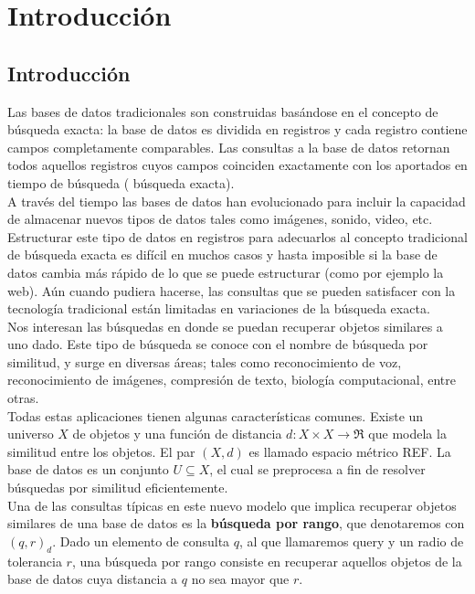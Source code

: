 \chapter{Introducci\'on}

\section{Introducci\'on}
Las bases de datos tradicionales son construidas bas\'andose en el concepto de b\'usqueda exacta: la base de datos es dividida en registros y cada registro contiene campos completamente comparables. Las consultas a la base de datos retornan todos aquellos registros cuyos campos coinciden exactamente con los aportados en tiempo de b\'usqueda ( b\'usqueda exacta).\\
				
A trav\'es del tiempo las bases de datos han evolucionado para incluir la capacidad de almacenar nuevos tipos de datos tales como im\'agenes, sonido, video, etc. Estructurar este tipo de datos en registros para adecuarlos al concepto tradicional de b\'usqueda exacta es dif\'icil en muchos casos y hasta imposible si la base de datos cambia m\'as r\'apido de lo que se puede estructurar (como por ejemplo la web). A\'un cuando pudiera hacerse, las consultas que se pueden satisfacer con la tecnolog\'ia tradicional est\'an limitadas en variaciones de la b\'usqueda exacta.\\
					
Nos interesan las b\'usquedas en donde se puedan recuperar objetos similares a uno dado. Este tipo de b\'usqueda se conoce con el nombre de b\'usqueda por similitud, y surge en diversas \'areas; tales como reconocimiento de voz, reconocimiento de im\'agenes, compresi\'on de texto, biolog\'ia computacional, entre otras.\\
					
Todas estas aplicaciones tienen algunas caracter\'isticas comunes. Existe un universo $X$ de objetos y una funci\'on de distancia $d: X \times X \rightarrow \Re$ que modela la similitud entre los objetos. El par $(X, d)$ es llamado espacio m\'etrico REF. La base de datos es un conjunto $U \subseteq X$, el cual se preprocesa a fin de resolver b\'usquedas por similitud eficientemente.\\
					
Una de las consultas t\'ipicas en este nuevo modelo que implica recuperar objetos similares de una base de datos es la \textbf{b\'usqueda por rango}, que denotaremos con $(q, r)_d$. Dado un elemento de consulta $q$, al que llamaremos query y un radio de tolerancia $r$, una b\'usqueda por rango consiste en recuperar aquellos objetos de la base de datos cuya distancia a $q$ no sea mayor que $r$.\\

